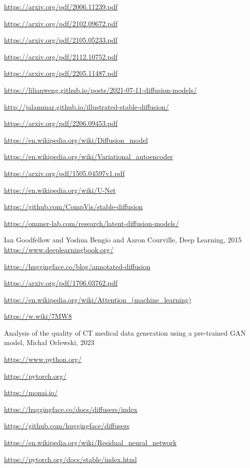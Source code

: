 \documentclass[11pt,a4paper]{report}
\begin{document}
\begin{thebibliography}{99}

\url{https://arxiv.org/pdf/2006.11239.pdf}

\url{https://arxiv.org/pdf/2102.09672.pdf}

\url{https://arxiv.org/pdf/2105.05233.pdf}

\url{https://arxiv.org/pdf/2112.10752.pdf}

\url{https://arxiv.org/pdf/2205.11487.pdf}
  
\url{ https://lilianweng.github.io/posts/2021-07-11-diffusion-models/}

\url{http://jalammar.github.io/illustrated-stable-diffusion/}

\url{https://arxiv.org/pdf/2206.09453.pdf}

\url{https://en.wikipedia.org/wiki/Diffusion_model}

\url{https://en.wikipedia.org/wiki/Variational_autoencoder}

\url{https://arxiv.org/pdf/1505.04597v1.pdf}

\url{https://en.wikipedia.org/wiki/U-Net}

\url{https://github.com/CompVis/stable-diffusion}

\url{https://ommer-lab.com/research/latent-diffusion-models/}

Ian Goodfellow and Yoshua Bengio and Aaron Courville, Deep Learning, 2015
\url{https://www.deeplearningbook.org/}

\url{https://huggingface.co/blog/annotated-diffusion}

\url{https://arxiv.org/pdf/1706.03762.pdf}

\url{https://en.wikipedia.org/wiki/Attention_(machine_learning)}

\url{https://w.wiki/7MW8}

Analysis of the quality of CT medical data generation using a pre-trained GAN model, Michał Orlewski, 2023

\url{https://www.python.org/}

\url{https://pytorch.org/}

\url{https://monai.io/}
  
\url{https://huggingface.co/docs/diffusers/index}

\url{https://github.com/huggingface/diffusers}

\url{https://en.wikipedia.org/wiki/Residual_neural_network}

\url{https://pytorch.org/docs/stable/index.html}
  
\end{thebibliography}
\end{document}
